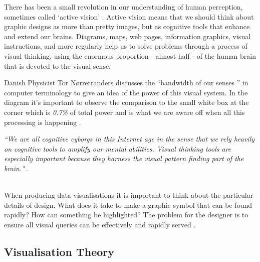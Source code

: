 \documentclass[a4paper,11pt,titlepage]{article}
\begin{document}
 		There has been a small revolution in our understanding of human perception, sometimes called `active vision' \cite{Ware2010}. Active vision means that we should think about graphic designs as more than pretty images, but as cognitive tools that enhance and extend our brains. Diagrams, maps, web pages, information graphics, visual instructions, and more regularly help us to solve problems through a process of visual thinking, using the enormous proportion - almost half - of the human brain that is devoted to the visual sense.  
	
		\par 
		Danish Physicist Tor Nørretranders discusses the ``bandwidth of our senses ” in computer terminology to give an idea of the power of this visual system. In the diagram it's important to observe the comparison to the small white box at the corner which is \textit{0.7\%} of total power and is what we are aware off when all this processing is happening \cite{Tufte2012}.		
		\par 
		\textit{``We are all cognitive cyborgs in this Internet age in the sense that we rely heavily on cognitive tools to amplify our mental abilities. Visual thinking tools are especially important because they harness the visual pattern finding part of the brain."} \cite{Ware2010}.
\\\

		\par 
		When producing data visualisations it is important to think about the particular details of design. What does it take to make a graphic symbol that can be found rapidly? How can something be highlighted? The problem for the designer is to ensure all visual queries can be effectively and rapidly served \cite{Keim2002}. 

	\subsection{Visualisation Theory}
\end{document}
